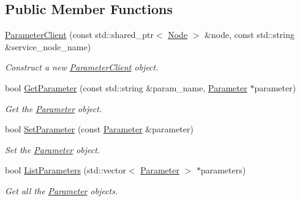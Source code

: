 \subsection*{Public Member Functions}
\begin{DoxyCompactItemize}
\item 
\hyperlink{classapollo_1_1cyber_1_1ParameterClient_a0a63cdffa8cf0a8793c964c1fad96dcb}{Parameter\-Client} (const std\-::shared\-\_\-ptr$<$ \hyperlink{classapollo_1_1cyber_1_1Node}{Node} $>$ \&node, const std\-::string \&service\-\_\-node\-\_\-name)
\begin{DoxyCompactList}\small\item\em Construct a new \hyperlink{classapollo_1_1cyber_1_1ParameterClient}{Parameter\-Client} object. \end{DoxyCompactList}\item 
bool \hyperlink{classapollo_1_1cyber_1_1ParameterClient_a8da3339334f14b14d89ae3c812f1a314}{Get\-Parameter} (const std\-::string \&param\-\_\-name, \hyperlink{classapollo_1_1cyber_1_1Parameter}{Parameter} $\ast$parameter)
\begin{DoxyCompactList}\small\item\em Get the \hyperlink{classapollo_1_1cyber_1_1Parameter}{Parameter} object. \end{DoxyCompactList}\item 
bool \hyperlink{classapollo_1_1cyber_1_1ParameterClient_a7862da312d013c50c82e4f6ae291ceb5}{Set\-Parameter} (const \hyperlink{classapollo_1_1cyber_1_1Parameter}{Parameter} \&parameter)
\begin{DoxyCompactList}\small\item\em Set the \hyperlink{classapollo_1_1cyber_1_1Parameter}{Parameter} object. \end{DoxyCompactList}\item 
bool \hyperlink{classapollo_1_1cyber_1_1ParameterClient_a1d8e6989c1e26d7fd3a5411171a7ccd6}{List\-Parameters} (std\-::vector$<$ \hyperlink{classapollo_1_1cyber_1_1Parameter}{Parameter} $>$ $\ast$parameters)
\begin{DoxyCompactList}\small\item\em Get all the \hyperlink{classapollo_1_1cyber_1_1Parameter}{Parameter} objects. \end{DoxyCompactList}\end{DoxyCompactItemize}
